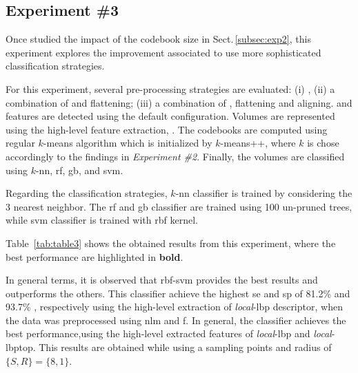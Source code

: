 \subsection{Experiment \#3}\label{subsec:exp3}
%
%
%
%

Once studied the impact of the codebook size in Sect.\,\ref{subsec:exp2}, this experiment explores the improvement associated to use more sophisticated classification strategies.

For this experiment, several pre-processing strategies are evaluated: (i) \nlm, (ii) a combination of \nlm and flattening; (iii) a combination of \nlm, flattening and aligning.
\lbp and \lbptop features are detected using the default configuration.
Volumes are represented using the high-level feature extraction, \bow. The codebooks are computed using regular $k$-means algorithm which is initialized by $k$-means++, where $k$ is chose accordingly to the findings in \emph{Experiment \#2}.
Finally, the volumes are classified using $k$-\ac{nn}, \ac{rf}, \ac{gb}, and \ac{svm}.

Regarding the classification strategies, $k$-\ac{nn} classifier is trained by considering the 3 nearest neighbor.
The \ac{rf} and \ac{gb} classifier are trained using 100 un-pruned trees, while \ac{svm} classifier is trained with \ac{rbf} kernel.

Table~\ref{tab:table3} shows the obtained results from this experiment, where the best performance are highlighted in \textbf{bold}.


In general terms, it is observed that \ac{rbf}-\ac{svm} provides the best results and outperforms the others.
This classifier achieve the highest \ac{se} and \ac{sp} of 81.2\% and 93.7\% , respectively using the high-level extraction of \emph{local}-\ac{lbp} descriptor, when the data was preprocessed using \ac{nlm} and \ac{f}.
In general, the classifier achieves the best performance,using the high-level extracted features of \emph{local}-\ac{lbp} and \emph{local}-\ac{lbptop}.
This results are obtained while using a sampling points and radius of $\{S,R\} = \{8,1\}$.

